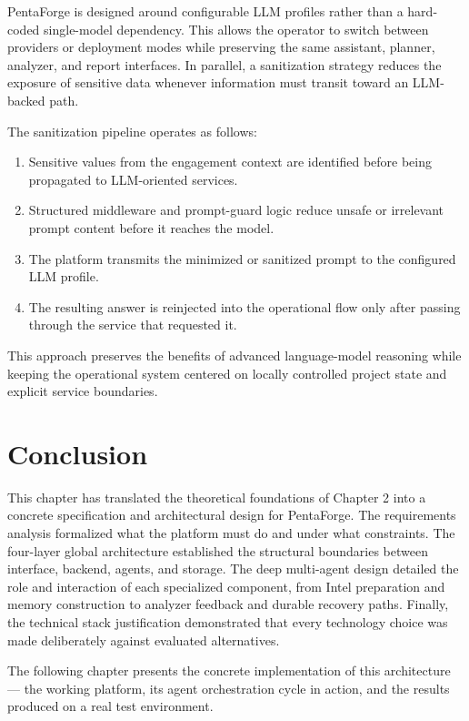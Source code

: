 \documentclass[12pt,a4paper]{report}
\begin{document}
PentaForge is designed around configurable LLM profiles rather than a hard-coded
single-model dependency. This allows the operator to switch between providers or
deployment modes while preserving the same assistant, planner, analyzer, and report
interfaces. In parallel, a sanitization strategy reduces the exposure of sensitive
data whenever information must transit toward an LLM-backed path.

The sanitization pipeline operates as follows:

\begin{enumerate}
    \item Sensitive values from the engagement context are identified before being
    propagated to LLM-oriented services.
    \item Structured middleware and prompt-guard logic reduce unsafe or irrelevant
    prompt content before it reaches the model.
    \item The platform transmits the minimized or sanitized prompt to the configured
    LLM profile.
    \item The resulting answer is reinjected into the operational flow only after
    passing through the service that requested it.
\end{enumerate}

This approach preserves the benefits of advanced language-model reasoning while
keeping the operational system centered on locally controlled project state and
explicit service boundaries.

\section*{Conclusion}

This chapter has translated the theoretical foundations of Chapter 2 into a concrete
specification and architectural design for PentaForge. The requirements analysis
formalized what the platform must do and under what constraints. The four-layer global
architecture established the structural boundaries between interface, backend, agents,
and storage. The deep multi-agent design detailed the role and interaction of each
specialized component, from Intel preparation and memory construction to analyzer
feedback and durable recovery paths. Finally, the technical stack justification
demonstrated that every technology choice was made deliberately against evaluated
alternatives.

The following chapter presents the concrete implementation of this architecture ---
the working platform, its agent orchestration cycle in action, and the results
produced on a real test environment.
\end{document}
